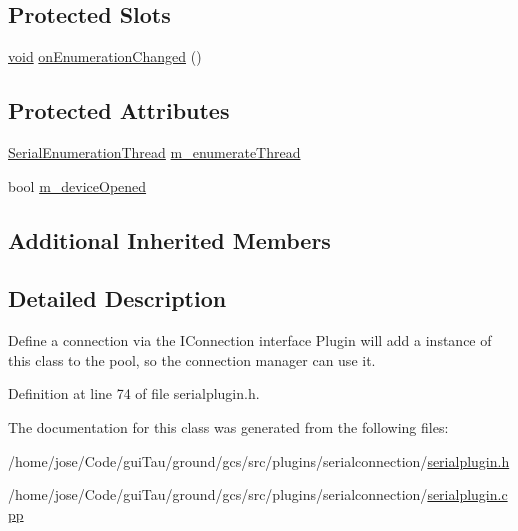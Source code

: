 \subsection*{Protected Slots}
\begin{DoxyCompactItemize}
\item 
\hyperlink{group___u_a_v_objects_plugin_ga444cf2ff3f0ecbe028adce838d373f5c}{void} \hyperlink{group___serial_plugin_gaa86538693d05fa3051ffebb2821d40fd}{on\-Enumeration\-Changed} ()
\end{DoxyCompactItemize}
\subsection*{Protected Attributes}
\begin{DoxyCompactItemize}
\item 
\hyperlink{class_serial_enumeration_thread}{Serial\-Enumeration\-Thread} \hyperlink{group___serial_plugin_ga5895d83033636cc3832bd9478f4415f7}{m\-\_\-enumerate\-Thread}
\item 
bool \hyperlink{group___serial_plugin_gac430f3139892f313e094560f5e2e72d1}{m\-\_\-device\-Opened}
\end{DoxyCompactItemize}
\subsection*{Additional Inherited Members}


\subsection{Detailed Description}
Define a connection via the I\-Connection interface Plugin will add a instance of this class to the pool, so the connection manager can use it. 

Definition at line 74 of file serialplugin.\-h.



The documentation for this class was generated from the following files\-:\begin{DoxyCompactItemize}
\item 
/home/jose/\-Code/gui\-Tau/ground/gcs/src/plugins/serialconnection/\hyperlink{serialplugin_8h}{serialplugin.\-h}\item 
/home/jose/\-Code/gui\-Tau/ground/gcs/src/plugins/serialconnection/\hyperlink{serialplugin_8cpp}{serialplugin.\-cpp}\end{DoxyCompactItemize}
